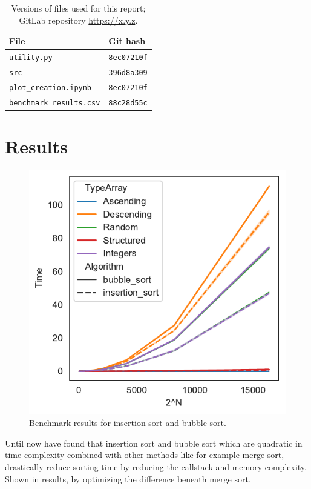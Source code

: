 \documentclass[sigconf, nonacm, natbib, screen, balance=False]{acmart}
\begin{document}
\begin{table}
  \caption{Versions of files used for this report; GitLab repository
    \url{https://x.y.z}.}
  \label{tab:hashes}
  \begin{tabular}{ll}
    \hline
    File & Git hash \\\hline
    \verb!utility.py! & \verb!8ec07210f! \\
    \verb!src! & \verb!396d8a309! \\
    \verb!plot_creation.ipynb! & \verb!8ec07210f! \\
    \verb!benchmark_results.csv! & \verb!88c28d55c! \\\hline
  \end{tabular}
\end{table}

\section{Results}\label{sec:results}

\begin{figure}
  \centering
  \includegraphics{foo}
  \caption{Benchmark results for insertion sort and bubble sort.}
  \label{fig:bench}
\end{figure}

Until now have found that insertion sort and bubble sort which are quadratic in time complexity combined with other methods like for example merge sort, drastically reduce sorting time by reducing the callstack and memory complexity. Shown in results, by optimizing the difference beneath merge sort.
\end{document}
